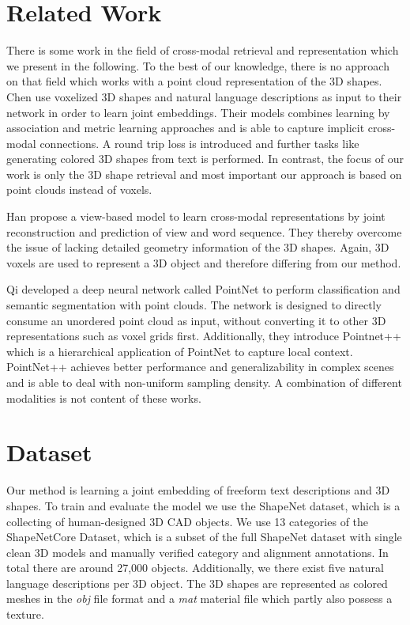 \documentclass[10pt,twocolumn,letterpaper]{article}
\begin{document}
\section{Related Work}
There is some work in the field of cross-modal retrieval and representation which we present in the following. To the best of our knowledge, there is no approach on that field which works with a point cloud representation of the 3D shapes. 
Chen \etal \cite{chen2018text2shape} use voxelized 3D shapes and natural language descriptions as input to their network in order to learn joint embeddings. Their models combines learning by association and metric learning approaches and is able to capture implicit cross-modal connections. A round trip loss is introduced and further tasks like generating colored 3D shapes from text is performed. In contrast, the focus of our work is only the 3D shape retrieval and most important our approach is based on point clouds instead of voxels. 

Han \etal \cite{han2018seq2seq} propose a view-based model to learn cross-modal representations by joint reconstruction and prediction of view and word sequence. They thereby overcome the issue of lacking detailed geometry information of the 3D shapes. Again, 3D voxels are used to represent a 3D object and therefore differing from our method.  

Qi \etal developed a deep neural network called PointNet \cite{qi2017pointnet} to perform classification and semantic segmentation with point clouds. The network is designed to directly consume an unordered point cloud as input, without converting it to other 3D representations such as voxel grids first. Additionally, they introduce Pointnet++ \cite{qi2017Pointnet++} which is a hierarchical application of PointNet to capture local context. PointNet++ achieves better performance and generalizability in complex scenes and is able to deal with non-uniform sampling density. A combination of different modalities is not content of these works. 

\section{Dataset}
Our method is learning a joint embedding of freeform text descriptions and 3D shapes. To train and evaluate the model we use the ShapeNet \cite{Chang2015Shapenet} dataset, which is a collecting of human-designed 3D CAD objects. We use 13 categories of the ShapeNetCore Dataset, which is a subset of the full ShapeNet dataset with single clean 3D models and manually verified category and alignment annotations. In total there are around 27,000 objects. Additionally, we there exist five natural language descriptions per 3D object. The 3D shapes are represented as colored meshes in the \textit{obj} file format and a \textit{mat} material file which partly also possess a texture.
\end{document}
